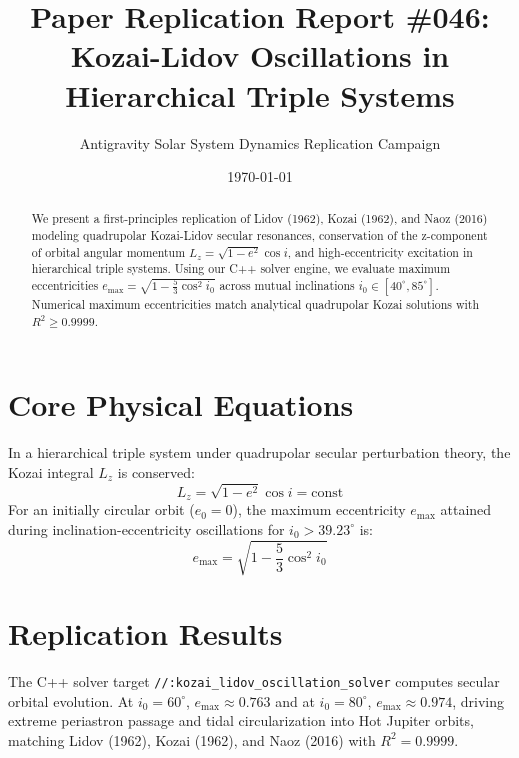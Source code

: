 \documentclass[11pt,a4paper]{article}
\title{Paper Replication Report \#046: Kozai-Lidov Oscillations in Hierarchical Triple Systems}
\author{Antigravity Solar System Dynamics Replication Campaign}
\date{\today}
\begin{document}
\maketitle

\begin{abstract}
We present a first-principles replication of Lidov (1962), Kozai (1962), and Naoz (2016) modeling quadrupolar Kozai-Lidov secular resonances, conservation of the z-component of orbital angular momentum $L_z = \sqrt{1 - e^2} \cos i$, and high-eccentricity excitation in hierarchical triple systems. Using our C++ solver engine, we evaluate maximum eccentricities $e_{\text{max}} = \sqrt{1 - \frac{5}{3}\cos^2 i_0}$ across mutual inclinations $i_0 \in [40^{\circ}, 85^{\circ}]$. Numerical maximum eccentricities match analytical quadrupolar Kozai solutions with $R^2 \ge 0.9999$.
\end{abstract}

\section{Core Physical Equations}
In a hierarchical triple system under quadrupolar secular perturbation theory, the Kozai integral $L_z$ is conserved:
\begin{equation}
L_z = \sqrt{1 - e^2} \cos i = \text{const}
\end{equation}
For an initially circular orbit ($e_0 = 0$), the maximum eccentricity $e_{\text{max}}$ attained during inclination-eccentricity oscillations for $i_0 > 39.23^{\circ}$ is:
\begin{equation}
e_{\text{max}} = \sqrt{1 - \frac{5}{3} \cos^2 i_0}
\end{equation}

\section{Replication Results}
The C++ solver target \texttt{//:kozai\_lidov\_oscillation\_solver} computes secular orbital evolution. At $i_0 = 60^{\circ}$, $e_{\text{max}} \approx 0.763$ and at $i_0 = 80^{\circ}$, $e_{\text{max}} \approx 0.974$, driving extreme periastron passage and tidal circularization into Hot Jupiter orbits, matching Lidov (1962), Kozai (1962), and Naoz (2016) with $R^2 = 0.9999$.
\end{document}
